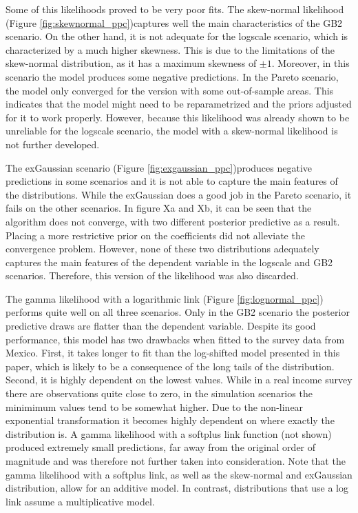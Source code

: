 Some of this likelihoods proved to be very poor fits.
The skew-normal likelihood (Figure \ref{fig:skewnormal_ppc})captures well the main characteristics of the GB2 scenario. On the other hand, it is not adequate for the logscale scenario, which is characterized by a much higher skewness.
This is due to the limitations of the skew-normal distribution, as it has a maximum skewness of $\pm 1$.
Moreover, in this scenario the model produces some negative predictions.
In the Pareto scenario, the model only converged for the version with some out-of-sample areas.
This indicates that the model might need to be reparametrized and the priors adjusted for it to work properly.
However, because this likelihood was already shown to be unreliable for the logscale scenario, the model with a skew-normal likelihood is not further developed.

The exGaussian scenario (Figure \ref{fig:exgaussian_ppc})produces negative predictions in some scenarios and it is not able to capture the main features of the distributions.
While the exGaussian does a good job in the Pareto scenario, it fails on the other scenarios.
In figure Xa and Xb, it can be seen that the algorithm does not converge, with two different posterior predictive as a result.
Placing a more restrictive prior on the coefficients did not alleviate the convergence problem.
However, none of these two distributions adequately captures the main features of the dependent variable in the logscale and GB2 scenarios.
Therefore, this version of the likelihood was also discarded.


The gamma likelihood with a logarithmic link (Figure \ref{fig:lognormal_ppc}) performs quite well on all three scenarios.
Only in the GB2 scenario the posterior predictive draws are flatter than the dependent variable.
Despite its good performance, this model has two drawbacks when fitted to the survey data from Mexico.
First, it takes longer to fit than the log-shifted model presented in this paper, which is likely to be a consequence of the long tails of the distribution.
Second, it is highly dependent on the lowest values.
While in a real income survey there are observations quite close to zero, in the simulation scenarios the minimimum values tend to be somewhat higher.
Due to the non-linear exponential transformation it becomes highly dependent on where exactly the distribution is.
A gamma likelihood with a softplus link function (not shown) produced extremely small predictions, far away from the original order of magnitude and was therefore not further taken into consideration.
Note that the gamma likelihood with a softplus link, as well as the skew-normal and exGaussian distribution, allow for an additive model.
In contrast, distributions that use a log link assume a multiplicative model.

